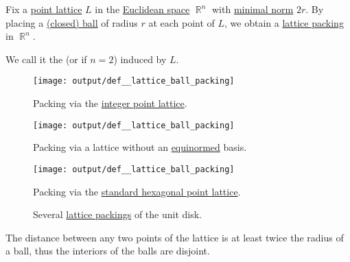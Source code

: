 \begin{definition}\label{def:lattice_ball_packing}\mimprovised
  Fix a \hyperref[def:point_lattice]{point lattice} \( L \) in the \hyperref[def:euclidean_space]{Euclidean space} \( \BbbR^n \) with \hyperref[def:minimal_lattice_vector]{minimal norm} \( 2r \). By placing a \hyperref[def:metric_space/ball]{(closed) ball} of radius \( r \) at each point of \( L \), we obtain a \hyperref[def:lattice_packing]{lattice packing} in \( \BbbR^n \).

  We call it the  (or  if \( n = 2 \)) induced by \( L \).

  \begin{figure}[!ht]
    \begin{subcaptionblock}[t]{0.3\textwidth}
      \centering
      \texttt{[image: output/def\_\_lattice\_ball\_packing]}
      \caption{Packing via the \hyperref[def:integer_point_lattice]{integer point lattice}.}\label{fig:def:lattice_ball_packing/integer}
    \end{subcaptionblock}
    \hfill
    \begin{subcaptionblock}[t]{0.3\textwidth}
      \centering
      \texttt{[image: output/def\_\_lattice\_ball\_packing]}
      \caption{Packing via a lattice without an \hyperref[def:equinormed]{equinormed} basis.}\label{fig:def:lattice_ball_packing/non_uniform}
    \end{subcaptionblock}
    \hfill
    \begin{subcaptionblock}[t]{0.3\textwidth}
      \centering
      \texttt{[image: output/def\_\_lattice\_ball\_packing]}
      \caption{Packing via the \hyperref[def:hexagonal_point_lattice]{standard hexagonal point lattice}.}\label{fig:def:lattice_ball_packing/hexagonal}
    \end{subcaptionblock}
    \caption{Several \hyperref[def:lattice_packing]{lattice packings} of the unit disk.}\label{fig:def:lattice_ball_packing}
  \end{figure}
\end{definition}
\begin{defproof}
  The distance between any two points of the lattice is at least twice the radius of a ball, thus the interiors of the balls are disjoint.
\end{defproof}

